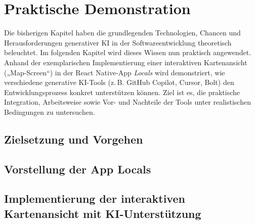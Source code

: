 \chapter{Praktische Demonstration}
Die bisherigen Kapitel haben die grundlegenden Technologien, Chancen und
Herausforderungen generativer KI in der Softwareentwicklung theoretisch
beleuchtet. Im folgenden Kapitel wird dieses Wissen nun praktisch angewendet.
Anhand der exemplarischen Implementierung einer interaktiven Kartenansicht
(„Map-Screen“) in der React Native-App \textit{Locals} wird demonstriert, wie
verschiedene generative KI-Tools (z.\,B. GitHub Copilot, Cursor, Bolt) den
Entwicklungsprozess konkret unterstützen können. Ziel ist es, die praktische
Integration, Arbeitsweise sowie Vor- und Nachteile der Tools unter
realistischen Bedingungen zu untersuchen.
\section{Zielsetzung und Vorgehen}


\section{Vorstellung der App \glqq Locals\grqq}


\section{Implementierung der interaktiven Kartenansicht mit KI-Unterstützung}


% 

% 